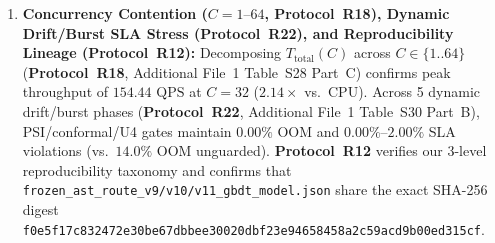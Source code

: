 \documentclass[10pt,a4paper]{article}
\begin{document}
\begin{enumerate}[leftmargin=1.5em,itemsep=1pt]
    \item \textbf{Concurrency Contention ($C=1\text{--}64$, \textbf{Protocol~R18}), Dynamic Drift/Burst SLA Stress (\textbf{Protocol~R22}), and Reproducibility Lineage (\textbf{Protocol~R12}):} Decomposing $T_{\text{total}}(C)$ across $C\in\{1..64\}$ (\textbf{Protocol~R18}, Additional File~1 Table~S28 Part~C) confirms peak throughput of $154.44\text{ QPS}$ at $C=32$ ($2.14\times$ vs.\ CPU). Across 5 dynamic drift/burst phases (\textbf{Protocol~R22}, Additional File~1 Table~S30 Part~B), PSI/conformal/U4 gates maintain $0.00\%$ OOM and $0.00\%\text{--}2.00\%$ SLA violations (vs.\ $14.0\%$ OOM unguarded). \textbf{Protocol~R12} verifies our 3-level reproducibility taxonomy and confirms that \texttt{frozen\_ast\_route\_v9/v10/v11\_gbdt\_model.json} share the exact SHA-256 digest \texttt{f0e5f17c832472e30be67dbbee30020dbf23e94658458a2c59acd9b00ed315cf}.
\end{enumerate}
\label{tab:v9_reviewer_reanalysis_matrix}\label{tab:v852_fair_guarded_ablation}\label{tab:router_ablation}
\end{document}
